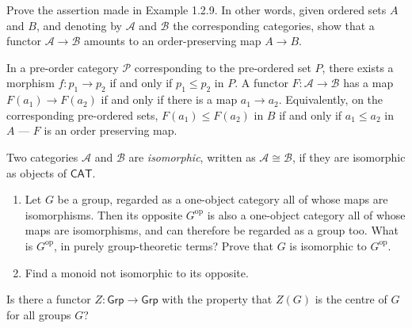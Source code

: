 \documentclass[12 pt, letterpaper]{hmcpset}
\begin{document}
\begin{problem}[1.2.22]
	Prove the assertion made in Example 1.2.9. In other words, given ordered sets $A$ and $B$, and denoting by $\mathscr{A}$ and $\mathscr{B}$ the corresponding categories, show that a functor $\mathscr{A} \to \mathscr{B}$ amounts to an order-preserving map $A \to B$.
\end{problem}

\begin{solution}
	In a pre-order category $\mathscr{P}$ corresponding to the pre-ordered set $P$, there exists a morphism $f : p_{1} \to p_{2}$ if and only if $p_{1} \le p_{2}$ in $P$. A functor $F : \mathscr{A} \to \mathscr{B}$ has a map $F(a_{1}) \to F(a_{2})$ if and only if there is a map $a_{1} \to a_{2}$. Equivalently, on the corresponding pre-ordered sets, $F(a_{1}) \le F(a_{2})$ in $B$ if and only if $a_{1} \le a_{2}$ in $A$ --- $F$ is an order preserving map.
\end{solution}

\pagebreak

\begin{problem}[1.2.23]
	Two categories $\mathscr{A}$ and $\mathscr{B}$ are \emph{isomorphic}, written as $\mathscr{A} \cong \mathscr{B}$, if they are isomorphic as objects of $\mathsf{CAT}$.
	\begin{enumerate}
		\item Let $G$ be a group, regarded as a one-object category all of whose maps are isomorphisms. Then its opposite $G^{\text{op}}$ is also a one-object category all of whose maps are isomorphisms, and can therefore be regarded as a group too. What is $G^{\text{op}}$, in purely group-theoretic terms? Prove that $G$ is isomorphic to $G^{\text{op}}$.
		\item Find a monoid not isomorphic to its opposite.
	\end{enumerate}
\end{problem}

\pagebreak

\begin{problem}[1.2.24]
	Is there a functor $Z : \mathsf{Grp} \to \mathsf{Grp}$ with the property that $Z(G)$ is the centre of $G$ for all groups $G$?
\end{problem}

\pagebreak
\end{document}
